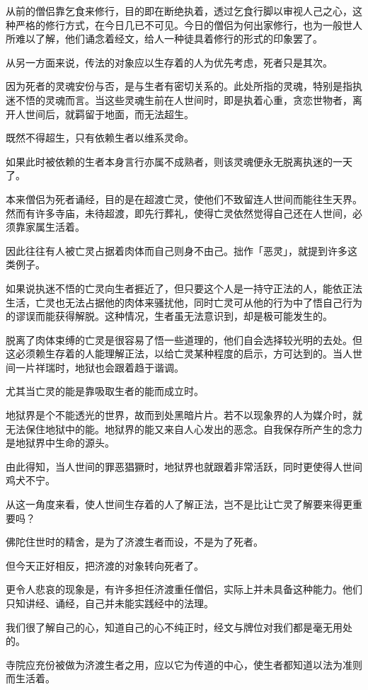\documentclass[twoside,openany]{book}
\begin{document}
从前的僧侣靠乞食来修行，目的即在断绝执着，透过乞食行脚以审视人己之心，这种严格的修行方式，在今日几已不可见。今日的僧侣为何出家修行，也为一般世人所难以了解，他们诵念着经文，给人一种徒具着修行的形式的印象罢了。

从另一方面来说，传法的对象应以生存着的人为优先考虑，死者只是其次。

因为死者的灵魂安份与否，是与生者有密切关系的。此处所指的灵魂，特别是指执迷不悟的灵魂而言。当这些灵魂生前在人世间时，即是执着心重，贪恋世物者，离开人世间后，就羁留于地面，而无法超生。

既然不得超生，只有依赖生者以维系灵命。

如果此时被依赖的生者本身言行亦属不成熟者，则该灵魂便永无脱离执迷的一天了。

本来僧侣为死者诵经，目的是在超渡亡灵，使他们不致留连人世间而能往生天界。然而有许多寺庙，未待超渡，即先行葬礼，使得亡灵依然觉得自己还在人世间，必须靠家属生活着。

因此往往有人被亡灵占据着肉体而自己则身不由己。拙作「恶灵」，就提到许多这类例子。

如果说执迷不悟的亡灵向生者捱近了，但只要这个人是一持守正法的人，能依正法生活，亡灵也无法占据他的肉体来骚扰他，同时亡灵可从他的行为中了悟自己行为的谬误而能获得解脱。这种情况，生者虽无法意识到，却是极可能发生的。

脱离了肉体束缚的亡灵是很容易了悟一些道理的，他们自会选择较光明的去处。但这必须赖生存着的人能理解正法，以给亡灵某种程度的启示，方可达到的。当人世间一片祥瑞时，地狱也会跟着趋于谐调。

尤其当亡灵的能是靠吸取生者的能而成立时。

地狱界是个不能透光的世界，故而到处黑暗片片。若不以现象界的人为媒介时，就无法保住地狱中的能。地狱界的能又来自人心发出的恶念。自我保存所产生的念力是地狱界中生命的源头。

由此得知，当人世间的罪恶猖獗时，地狱界也就跟着非常活跃，同时更使得人世间鸡犬不宁。

从这一角度来看，使人世间生存着的人了解正法，岂不是比让亡灵了解要来得更重要吗？

佛陀住世时的精舍，是为了济渡生者而设，不是为了死者。

但今天正好相反，把济渡的对象转向死者了。

更令人悲哀的现象是，有许多担任济渡重任僧侣，实际上并未具备这种能力。他们只知讲经、诵经，自己并未能实践经中的法理。

我们很了解自己的心，知道自己的心不纯正时，经文与牌位对我们都是毫无用处的。

寺院应充份被做为济渡生者之用，应以它为传道的中心，使生者都知道以法为准则而生活着。
\end{document}

